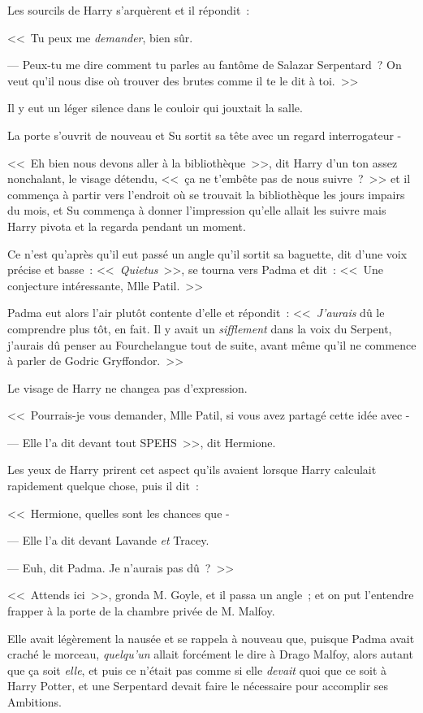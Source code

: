 Les sourcils de Harry s'arquèrent et il répondit~:

<<~Tu peux me \emph{demander}, bien sûr.

--- Peux-tu me dire comment tu parles au fantôme de Salazar Serpentard~? On veut qu'il nous dise où trouver des brutes comme il te le dit à toi.~>>

Il y eut un léger silence dans le couloir qui jouxtait la salle.

La porte s'ouvrit de nouveau et Su sortit sa tête avec un regard interrogateur -

<<~Eh bien nous devons aller à la bibliothèque~>>, dit Harry d'un ton assez nonchalant, le visage détendu, <<~ça ne t'embête pas de nous suivre~?~>> et il commença à partir vers l'endroit où se trouvait la bibliothèque les jours impairs du mois, et Su commença à donner l'impression qu'elle allait les suivre mais Harry pivota et la regarda pendant un moment.

Ce n'est qu'après qu'il eut passé un angle qu'il sortit sa baguette, dit d'une voix précise et basse~: <<~\emph{Quietus}~>>, se tourna vers Padma et dit~: <<~Une conjecture intéressante, Mlle Patil.~>>

Padma eut alors l'air plutôt contente d'elle et répondit~: <<~\emph{J'aurais} dû le comprendre plus tôt, en fait. Il y avait un \emph{sifflement} dans la voix du Serpent, j'aurais dû penser au Fourchelangue tout de suite, avant même qu'il ne commence à parler de Godric Gryffondor.~>>

Le visage de Harry ne changea pas d'expression.

<<~Pourrais-je vous demander, Mlle Patil, si vous avez partagé cette idée avec -

--- Elle l'a dit devant tout SPEHS~>>, dit Hermione.

Les yeux de Harry prirent cet aspect qu'ils avaient lorsque Harry calculait rapidement quelque chose, puis il dit~:

<<~Hermione, quelles sont les chances que -

--- Elle l'a dit devant Lavande \emph{et} Tracey.

--- Euh, dit Padma. Je n'aurais pas dû~?~>>

\later

<<~Attends ici~>>, gronda M. Goyle, et il passa un angle~; et on put l'entendre frapper à la porte de la chambre privée de M. Malfoy.

Elle avait légèrement la nausée et se rappela à nouveau que, puisque Padma avait craché le morceau, \emph{quelqu'un} allait forcément le dire à Drago Malfoy, alors autant que ça soit \emph{elle}, et puis ce n'était pas comme si elle \emph{devait} quoi que ce soit à Harry Potter, et une Serpentard devait faire le nécessaire pour accomplir ses Ambitions.

